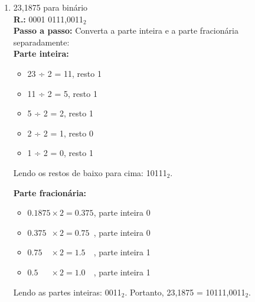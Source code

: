 \documentclass{article}[12pt]
\begin{document}
\begin{enumerate}
\begin{enumerate}
            \item 23,1875 para binário \\
            \textbf{R.:} 0001 0111,0011$_2$ \\
            \textbf{Passo a passo:} Converta a parte inteira e a parte fracionária separadamente: \\
                \textbf{Parte inteira:}
                \begin{itemize}
                    \item 23 ÷ 2 = \phantom{0}11, resto 1
                    \item 11 ÷ 2 = \phantom{00}5, resto 1
                    \item \phantom{0}5 ÷ 2 = \phantom{00}2, resto 1
                    \item \phantom{0}2 ÷ 2 = \phantom{00}1, resto 0
                    \item \phantom{0}1 ÷ 2 = \phantom{00}0, resto 1
                \end{itemize}
                Lendo os restos de baixo para cima: 10111$_2$.

                \textbf{Parte fracionária:}
                \begin{itemize}
                    \item $0.1875           \times 2 = 0.375$, parte inteira 0
                    \item $0.375\phantom{0} \times 2 = 0.75\phantom{0}$, parte inteira 0
                    \item $0.75\phantom{00} \times 2 = 1.5\phantom{00}$, parte inteira 1
                    \item $0.5\phantom{000} \times 2 = 1.0\phantom{00}$, parte inteira 1
                \end{itemize}
            Lendo as partes inteiras: 0011$_2$.
            Portanto, 23,1875 = 10111,0011$_2$.


\end{enumerate}
\end{enumerate}
\end{document}
